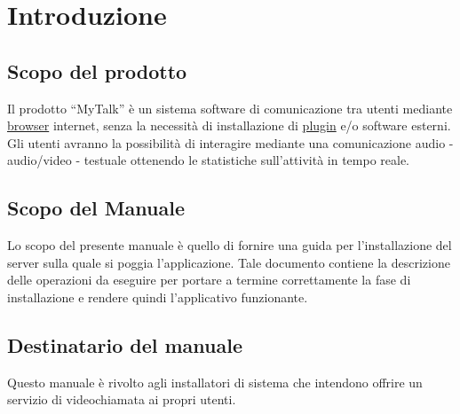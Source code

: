 

\setcounter{page}{1}
\pagestyle{normal}

\section{Introduzione}
\subsection{Scopo del prodotto}
Il prodotto ``MyTalk'' è un sistema software di comunicazione tra utenti mediante \underline{browser} internet, senza la necessità di installazione di \underline{plugin} e/o software esterni. Gli utenti avranno la possibilità di interagire mediante una comunicazione audio - audio/video - testuale ottenendo le statistiche sull'attività in tempo reale.

\subsection{Scopo del Manuale}
Lo scopo del presente manuale è quello di fornire una guida per l'installazione del server sulla quale si poggia l'applicazione. Tale documento contiene la descrizione delle operazioni da eseguire per portare a termine correttamente la fase di installazione e rendere quindi l'applicativo funzionante.

\subsection{Destinatario del manuale}
Questo manuale è rivolto agli installatori di sistema che intendono offrire un servizio di videochiamata ai propri utenti.

